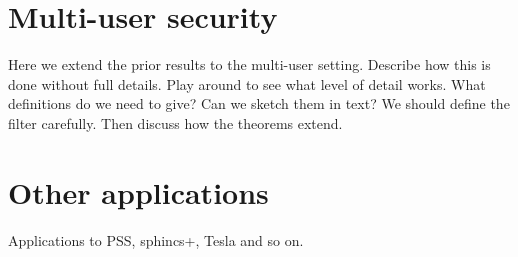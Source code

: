 \section{Multi-user security} \label{sec-mu}


Here we extend the prior results to the multi-user setting. Describe how this is done without full details. Play around to see what level of detail works. What definitions do we need to give? Can we sketch them in text? We should define the filter carefully. Then discuss how the theorems extend.


\section{Other applications}

Applications to PSS, sphincs+, Tesla and so on.



